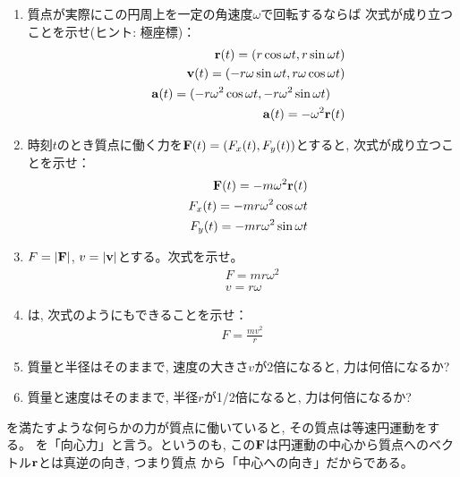 \begin{q}\label{q:circle_motion}
\begin{enumerate}
\item 質点が実際にこの円周上を一定の角速度$\omega$で回転するならば
次式が成り立つことを示せ(ヒント: 極座標)：
\begin{eqnarray}
&&{\bf r}(t)=(r\cos\omega t, r\sin\omega t)\label{eq:circle_motion_xy}\\
&&{\bf v}(t)=(-r\omega\sin\omega t, r\omega\cos\omega t)\label{eq:circle_motion_vxvy}\\
&&{\bf a}(t)=(-r\omega^2\cos\omega t, -r\omega^2\sin\omega t)\label{eq:circle_motion_axay}\,\,\,\,\,\,\,\\
&&{\bf a}(t)=-\omega^2{\bf r}(t)\label{eq:circle_motion_a}
\end{eqnarray}
\item 時刻$t$のとき質点に働く力を${\bf F}(t)=(F_x(t), F_y(t))$とすると, 次式が成り立つことを示せ：
\begin{eqnarray}
&&{\bf F}(t)=-m\omega^2{\bf r}(t)\label{eq:mromegasq_vec}\\
&&F_x(t)=-mr\omega^2\cos\omega t\\
&&F_y(t)=-mr\omega^2\sin\omega t
\end{eqnarray}
\item $F=|{\bf F}|$, $v=|{\bf v}|$とする。次式を示せ。
\begin{eqnarray}
&&F=mr\omega^2\label{eq:mromegasq}\\
&&v=r\omega\label{eq:circle_motion_v_romega}
\end{eqnarray}
\item {}は, 次式のようにもできることを示せ：
\begin{eqnarray}
F=\frac{mv^2}{r}\label{eq:mvsqovr}
\end{eqnarray}
\item 質量と半径はそのままで, 速度の大きさ$v$が2倍になると, 力は何倍になるか? 
\item 質量と速度はそのままで, 半径$r$が1/2倍になると, 力は何倍になるか? 
\end{enumerate}
\end{q}
\vspace{0.2cm}

を満たすような何らかの力が質点に働いていると, その質点は等速円運動をする。
を「向心力」と言う。というのも, 
この${\bf F}$は円運動の中心から質点へのベクトル${\bf r}$とは真逆の向き, つまり質点
から「中心への向き」だからである。

